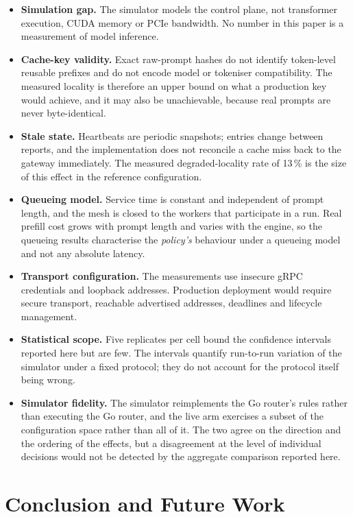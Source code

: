 \documentclass[10pt,twocolumn]{article}
\begin{document}
\begin{itemize}
\item \textbf{Simulation gap.} The simulator models the control plane, not
transformer execution, CUDA memory or PCIe bandwidth. No number in this paper
is a measurement of model inference.
\item \textbf{Cache-key validity.} Exact raw-prompt hashes do not identify
token-level reusable prefixes and do not encode model or tokeniser
compatibility. The measured locality is therefore an upper bound on what a
production key would achieve, and it may also be unachievable, because real
prompts are never byte-identical.
\item \textbf{Stale state.} Heartbeats are periodic snapshots; entries change
between reports, and the implementation does not reconcile a cache miss back
to the gateway immediately. The measured degraded-locality rate of 13\,\% is
the size of this effect in the reference configuration.
\item \textbf{Queueing model.} Service time is constant and independent of
prompt length, and the mesh is closed to the workers that participate in a
run. Real prefill cost grows with prompt length and varies with the engine,
so the queueing results characterise the \emph{policy's} behaviour under a
queueing model and not any absolute latency.
\item \textbf{Transport configuration.} The measurements use insecure gRPC
credentials and loopback addresses. Production deployment would require
secure transport, reachable advertised addresses, deadlines and lifecycle
management.
\item \textbf{Statistical scope.} Five replicates per cell bound the
confidence intervals reported here but are few. The intervals quantify
run-to-run variation of the simulator under a fixed protocol; they do not
account for the protocol itself being wrong.
\item \textbf{Simulator fidelity.} The simulator reimplements the Go
router's rules rather than executing the Go router, and the live arm
exercises a subset of the configuration space rather than all of it. The
two agree on the direction and the ordering of the effects, but a
disagreement at the level of individual decisions would not be detected by
the aggregate comparison reported here.
\end{itemize}

\section{Conclusion and Future Work}
\end{document}

